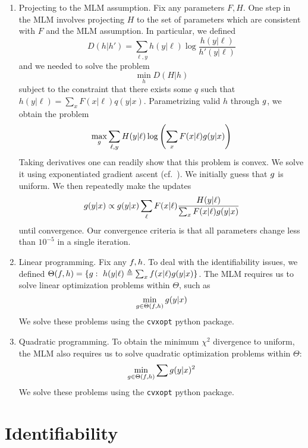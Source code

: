 \begin{enumerate}

    \item Projecting to the MLM assumption.  Fix any parameters $F,H$.  One step in the MLM involves projecting $H$ to the set of parameters which are consistent with $F$ and the MLM assumption.  In particular, we defined
    \[
    D(h|h') = \sum_{\ell,y} h(y|\ell) \log \frac{h(y|\ell)}{h'(y|\ell)}
    \]
    and we needed to solve the problem
    \[
    \min_{h} D(H|h)
    \]
    subject to the constraint that there exists some $q$ such that $h(y|\ell)=\sum_x F(x|\ell)q(y|x)$.  Parametrizing valid $h$ through $g$, we obtain the problem
    \[
    \max_{g} \sum_{\ell,y} H(y|\ell) \log \left(\sum_x F(x|\ell) g(y|x)\right)
    \]
    Taking derivatives one can readily show that this problem is convex.  We solve it using exponentiated gradient ascent (cf.\ \cite{kivinen1995additive}).  We initially guess that $g$ is uniform.  We then repeatedly make the updates
    \begin{align*}
    g(y|x)  &\propto g(y|x)\sum_{\ell}F(x|\ell)\frac{H(y|\ell)}{\sum_x F(x|\ell)g(y|x)}\\
    \end{align*}
    until convergence.  Our convergence criteria is that all parameters change less than $10^{-5}$ in a single iteration.

    \item Linear programming.  Fix any $f,h$.  To deal with the identifiability issues, we defined $\Theta(\plx,\ply)=\{\pxy:\ \ply(y|\ell) \triangleq \sum_x \plx(x|\ell)\pxy(y|x)\}$.  The MLM requires us to solve linear optimization problems within $\Theta$, such as 
    \[
    \min_{g\in \Theta(f,h)} g(y|x) \\
    \]
    We solve these problems using the {\tt cvxopt} python package.

    \item Quadratic programming.  To obtain the minimum $\chi^2$ divergence to uniform, the MLM also requires us to solve quadratic optimization problems within $\Theta$:
    \[
    \min_{g \in \Theta(f,h)} \sum g(y|x)^2 \\
    \]
    We solve these problems using the {\tt cvxopt} python package.


\end{enumerate}

\section{Identifiability}


